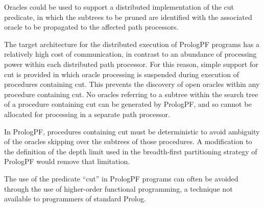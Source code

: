 Oracles could be used to support a distributed implementation of the cut predicate, in
which the subtrees to be pruned are identified with the associated oracle to be propagated
to the affected path processors.

The target architecture for the distributed execution of PrologPF programs has a relatively
high cost of communication, in contrast to an abundance of processing power within each
distributed path processor.  For this reason, simple support for cut is provided in which
oracle processing is suspended during execution of procedures containing cut.  This prevents
the discovery of open oracles within any procedure containing cut. No oracles
referring to a subtree within the search tree of a procedure containing cut can be generated
by PrologPF, and so cannot be allocated for processing in a separate path processor.

In PrologPF, procedures containing cut must be deterministic to avoid ambiguity of the
oracles skipping over the subtrees of those procedures.  A modification to the definition
of the depth limit used in the breadth-first partitioning strategy of PrologPF would remove
that limitation.

The use of the predicate ``cut'' in PrologPF programs can often be avoided through the
use of higher-order functional programming, a technique not available to programmers of
standard Prolog.




